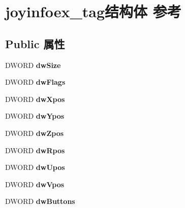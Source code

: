 \hypertarget{structjoyinfoex__tag}{}\section{joyinfoex\+\_\+tag结构体 参考}
\label{structjoyinfoex__tag}
\subsection*{Public 属性}
\begin{DoxyCompactItemize}
\item 
\mbox{\label{structjoyinfoex__tag_a3e3914fddbf8b1ed5e9698a5a8ba2595}} 
D\+W\+O\+RD {\bfseries dw\+Size}
\item 
\mbox{\label{structjoyinfoex__tag_a3c104cabf2999566cd9428915c4bb3ae}} 
D\+W\+O\+RD {\bfseries dw\+Flags}
\item 
\mbox{\label{structjoyinfoex__tag_a57711027c8e441017f00ac300291b7d2}} 
D\+W\+O\+RD {\bfseries dw\+Xpos}
\item 
\mbox{\label{structjoyinfoex__tag_a3755985c433706d7518e4b43ce461dc0}} 
D\+W\+O\+RD {\bfseries dw\+Ypos}
\item 
\mbox{\label{structjoyinfoex__tag_a3be71d47d1d6850279b9a9861e5a3ffb}} 
D\+W\+O\+RD {\bfseries dw\+Zpos}
\item 
\mbox{\label{structjoyinfoex__tag_a02133b11281dfc4fbe20bee4fda1602c}} 
D\+W\+O\+RD {\bfseries dw\+Rpos}
\item 
\mbox{\label{structjoyinfoex__tag_aee22c166be6d998bc4bba00f003fd326}} 
D\+W\+O\+RD {\bfseries dw\+Upos}
\item 
\mbox{\label{structjoyinfoex__tag_a3c176287a2278546606b7368c4040172}} 
D\+W\+O\+RD {\bfseries dw\+Vpos}
\item 
\mbox{\label{structjoyinfoex__tag_ad6327226836f2cf40b93f5fed03f6eb6}} 
D\+W\+O\+RD {\bfseries dw\+Buttons}
\item 
\mbox{\label{structjoyinfoex__tag_a89cca28b944936cc27f2bb3bda5ff59a}} 

\end{DoxyCompactItemize}

